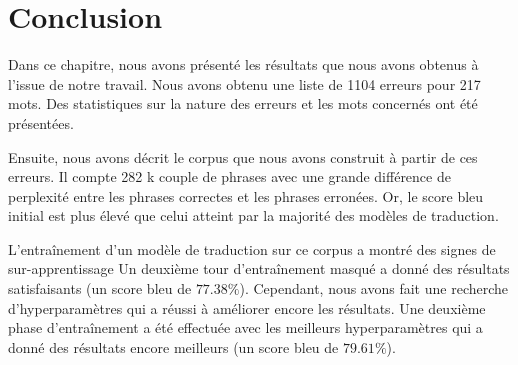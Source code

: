 \section{Conclusion}%
\label{sec.results.conclusion}

Dans ce chapitre, nous avons présenté les résultats que nous avons obtenus à l'issue de notre travail.
Nous avons obtenu une liste de 1104 erreurs pour 217 mots.
Des statistiques sur la nature des erreurs et les mots concernés ont été présentées.

Ensuite, nous avons décrit le corpus que nous avons construit à partir de ces erreurs.
Il compte 282 k couple de phrases avec une grande différence de perplexité 
entre les phrases correctes et les phrases erronées.
Or, le score \gls{bleu} initial est plus élevé que celui atteint par la majorité des modèles de traduction.

L'entraînement d'un modèle de traduction sur ce corpus a montré des signes de sur-apprentissage
Un deuxième tour d'entraînement masqué a donné des résultats satisfaisants (un score \gls{bleu} de \(77.38\%\)).
Cependant, nous avons fait une recherche d'hyperparamètres qui a réussi à améliorer encore les résultats.
Une deuxième phase d'entraînement a été effectuée avec les meilleurs hyperparamètres 
qui a donné des résultats encore meilleurs (un score \gls{bleu} de \(79.61\%\)).
